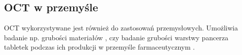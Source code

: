 \subsection{OCT w przemyśle}

OCT wykorzystywane jest również do zastosowań przemysłowych. Umożliwia badanie np. grubości materiałów \cite{walecki2006determining}, czy badanie grubości warstwy pancerza tabletek podczas ich produkcji w przemyśle farmaceutycznym \cite{markl2014device}.
















